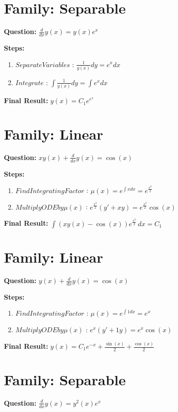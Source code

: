 \documentclass{article}
\begin{document}
\section*{Family: Separable}
\textbf{Question:} $\frac{d}{d x} y{\left(x \right)} = y{\left(x \right)} e^{x}$

\textbf{Steps:}
\begin{enumerate}
\item $Separate Variables$ :  $\frac{1}{y{\left(x \right)}} dy = e^{x} dx$
\item $Integrate$ :  $\int \frac{1}{y{\left(x \right)}} dy = \int e^{x} dx$
\end{enumerate}
\textbf{Final Result:} $y{\left(x \right)} = C_{1} e^{e^{x}}$

\section*{Family: Linear}
\textbf{Question:} $x y{\left(x \right)} + \frac{d}{d x} y{\left(x \right)} = \cos{\left(x \right)}$

\textbf{Steps:}
\begin{enumerate}
\item $Find Integrating Factor$ :  $\mu(x) = e^{\int x dx} = e^{\frac{x^{2}}{2}}$
\item $Multiply ODE by \mu(x)$ :  $e^{\frac{x^{2}}{2}}(y' + xy) = e^{\frac{x^{2}}{2}} \cos{\left(x \right)}$
\end{enumerate}
\textbf{Final Result:} $\int \left(x y{\left(x \right)} - \cos{\left(x \right)}\right) e^{\frac{x^{2}}{2}}\, dx = C_{1}$

\section*{Family: Linear}
\textbf{Question:} $y{\left(x \right)} + \frac{d}{d x} y{\left(x \right)} = \cos{\left(x \right)}$

\textbf{Steps:}
\begin{enumerate}
\item $Find Integrating Factor$ :  $\mu(x) = e^{\int 1 dx} = e^{x}$
\item $Multiply ODE by \mu(x)$ :  $e^{x}(y' + 1y) = e^{x} \cos{\left(x \right)}$
\end{enumerate}
\textbf{Final Result:} $y{\left(x \right)} = C_{1} e^{- x} + \frac{\sin{\left(x \right)}}{2} + \frac{\cos{\left(x \right)}}{2}$

\section*{Family: Separable}
\textbf{Question:} $\frac{d}{d x} y{\left(x \right)} = y^{2}{\left(x \right)} e^{x}$
\end{document}

